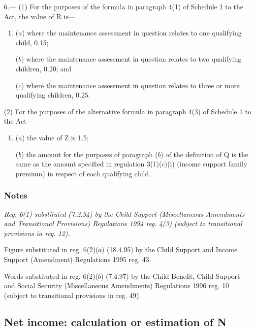 \documentclass[a4paper]{article}
\newcommand\amendment[1]{\subsubsection*{Notes}{\itshape\frenchspacing\footnotesize #1 \par\goodbreak}}
\begin{document}
6.—%
(1) For the purposes of the formula in paragraph 4(1) of Schedule 1 to the Act, the value of R is—
\begin{enumerate}\item[]
($a$) where the maintenance assessment in question relates to one qualifying child, 0.15;

($b$) where the maintenance assessment in question relates to two qualifying children, 0.20; and

($c$) where the maintenance assessment in question relates to three or more qualifying children, 0.25.
\end{enumerate}%

(2) For the purposes of the alternative formula in paragraph 4(3) of Schedule 1 to the Act—
\begin{enumerate}\item[]
($a$) the value of Z is 
1.5;  %

($b$) the amount for the purposes of paragraph ($b$) of the definition of Q is the same as the amount specified in 
regulation 3(1)($c$)(i)  %
(income support family premium) in respect of each qualifying child.
\end{enumerate}

\amendment{
Reg. 6(1) substituted (7.2.94) by the Child Support (Miscellaneous Amendments and Transitional Provisions) Regulations 1994 reg. 4(3) (subject to transitional provisions in reg. 12).

Figure substituted in reg. 6(2)($a$) (18.4.95) by the Child Support and Income Support (Amendment) Regulations 1995 reg. 43.

Words substituted in reg. 6(2)($b$) (7.4.97) by the Child Benefit, Child Support and Social Security (Miscellaneous Amendments) Regulations 1996 reg. 10 (subject to transitional provisions in reg. 49).
}

\subsection[7. Net income: calculation or estimation of N]{Net income: calculation or estimation of N}
\end{document}
